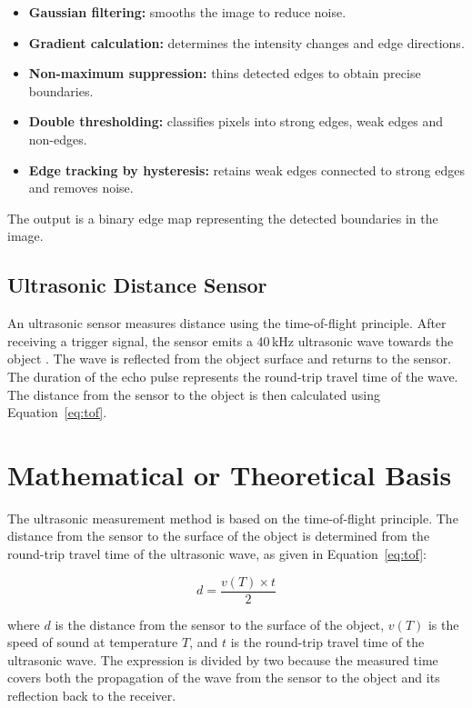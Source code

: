 \begin{itemize}
    \item \textbf{Gaussian filtering:} smooths the image to reduce noise.
    \item \textbf{Gradient calculation:} determines the intensity changes and edge directions.
    \item \textbf{Non-maximum suppression:} thins detected edges to obtain precise boundaries.
    \item \textbf{Double thresholding:} classifies pixels into strong edges, weak edges and non-edges.
    \item \textbf{Edge tracking by hysteresis:} retains weak edges connected to strong edges and removes noise.
\end{itemize}

The output is a binary edge map representing the detected boundaries in the image.

\subsection{Ultrasonic Distance Sensor}

An ultrasonic sensor measures distance using the time-of-flight principle. After receiving a trigger signal, the sensor emits a 40\,kHz ultrasonic wave towards the object \cite{hcsr04, srf05}. The wave is reflected from the object surface and returns to the sensor. The duration of the echo pulse represents the round-trip travel time of the wave. The distance from the sensor to the object is then calculated using Equation~\eqref{eq:tof}.

\section{Mathematical or Theoretical Basis}

The ultrasonic measurement method is based on the time-of-flight principle. The distance from the sensor to the surface of the object is determined from the round-trip travel time of the ultrasonic wave, as given in Equation~\eqref{eq:tof}:

\begin{equation}
\label{eq:tof}
d = \frac{v(T) \times t}{2}
\end{equation}

where $d$ is the distance from the sensor to the surface of the object, $v(T)$ is the speed of sound at temperature $T$, and $t$ is the round-trip travel time of the ultrasonic wave. The expression is divided by two because the measured time covers both the propagation of the wave from the sensor to the object and its reflection back to the receiver.

